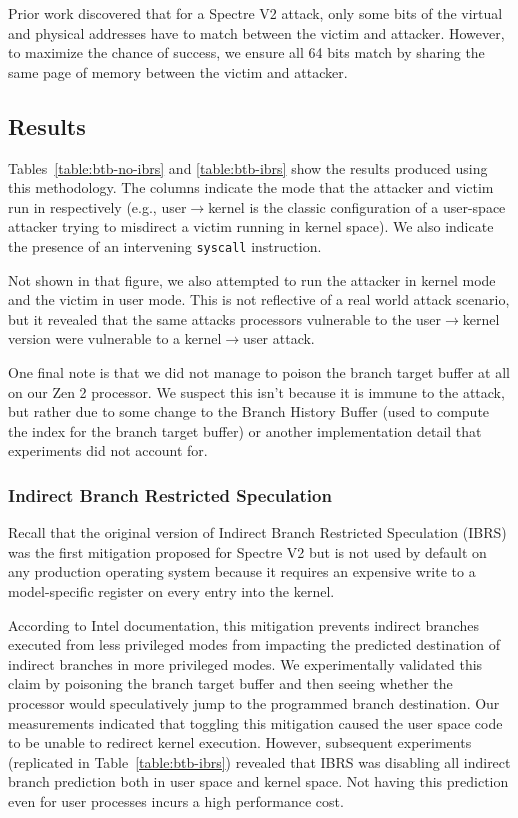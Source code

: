 Prior work discovered that for a Spectre V2 attack, only some bits of the virtual and physical addresses have to match between the victim and attacker.
However, to maximize the chance of success, we ensure all 64 bits match by sharing the same page of memory between the victim and attacker.

\subsection{Results}

Tables~\ref{table:btb-no-ibrs} and \ref{table:btb-ibrs} show the results produced using this methodology.
The columns indicate the mode that the attacker and victim run in
respectively (e.g., user$\rightarrow$kernel is the classic
configuration of a user-space attacker trying to misdirect a victim running in kernel space).
We also indicate the presence of an intervening \texttt{syscall} instruction.

Not shown in that figure, we also attempted to run the attacker in kernel mode and the victim in user mode.
This is not reflective of a real world attack scenario, but it revealed that the same attacks processors vulnerable to the user$\rightarrow$kernel version were vulnerable to a kernel$\rightarrow$user attack.

One final note is that we did not manage to poison the branch target buffer at all on our Zen 2 processor.
We suspect this isn't because it is immune to the attack, but rather due to some change to the Branch History Buffer (used to compute the index for the branch target buffer) or another implementation detail that experiments did not account for.

\subsubsection{Indirect Branch Restricted Speculation}

Recall that the original version of Indirect Branch Restricted Speculation (IBRS) was the first mitigation proposed for Spectre V2 but is not used by default on any production operating system because it requires an expensive write to a model-specific register on every entry into the kernel.

According to Intel documentation, this mitigation prevents indirect branches executed from less privileged modes from impacting the predicted destination of indirect branches in more privileged modes.
We experimentally validated this claim by poisoning the branch target buffer and then seeing whether the processor would speculatively jump to the programmed branch destination.
Our measurements indicated that toggling this mitigation caused the
user space code to be unable to redirect kernel execution.
However, subsequent experiments (replicated in
Table~\ref{table:btb-ibrs}) revealed that IBRS was disabling all
indirect branch prediction both in user space and kernel space.
Not having this prediction even for user processes incurs a high performance cost.

